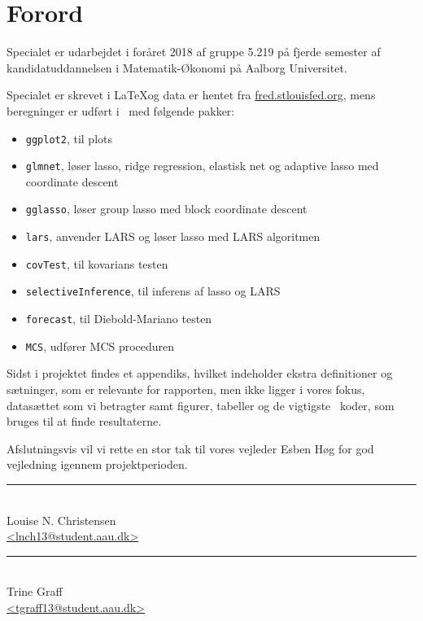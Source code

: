 \chapter{Forord} \label{ch:forord}
Specialet er udarbejdet i foråret 2018 af gruppe 5.219 på fjerde semester af kandidatuddannelsen i Matematik-Økonomi på Aalborg Universitet.

Specialet er skrevet i \LaTeX og data er hentet fra \url{fred.stlouisfed.org}, mens beregninger er udført i \Rlang ~med følgende pakker:
%
\begin{itemize}
	\item \texttt{ggplot2}, til plots
	\item \texttt{glmnet}, løser lasso, ridge regression, elastisk net og adaptive lasso med coordinate descent
	\item \texttt{gglasso}, løser group lasso med block coordinate descent
	\item \texttt{lars}, anvender LARS og løser lasso med LARS algoritmen 
	\item \texttt{covTest}, til kovarians testen
	\item \texttt{selectiveInference}, til inferens af lasso og LARS
	\item \texttt{forecast}, til Diebold-Mariano testen
	\item \texttt{MCS}, udfører MCS proceduren
\end{itemize}
%
Sidst i projektet findes et appendiks, hvilket indeholder ekstra definitioner og sætninger, som er relevante for rapporten, men ikke ligger i vores fokus, datasættet som vi betragter samt figurer, tabeller og de vigtigste \Rlang ~koder, som bruges til at finde resultaterne. 

Afslutningsvis vil vi rette en stor tak til vores vejleder Esben Høg for god vejledning igennem projektperioden.

%
%
\vfill
%

\begin{center}
\begin{minipage}[b]{0.45\textwidth}
 \centering
 \rule{\textwidth}{0.5pt}\\
  Louise N. Christensen\\
 {\footnotesize\ttfamily \href{mailto:lnch13@student.aau.dk}{<lnch13@student.aau.dk>}}
\end{minipage}
\hfill
\begin{minipage}[b]{0.45\textwidth}
 \centering
 \rule{\textwidth}{0.5pt}\\
  Trine Graff\\
 {\footnotesize\ttfamily \href{mailto:tgraff13@student.aau.dk}{<tgraff13@student.aau.dk>}}
\end{minipage}
\end{center}


